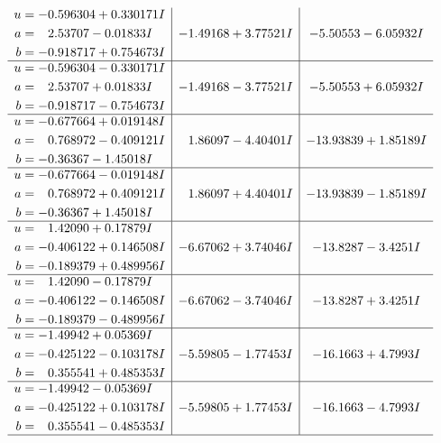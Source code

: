 \documentclass[1p]{elsarticle_modified}
\theoremstyle{definition}
\begin{document}
$$\begin{array}{c|c|c}
\begin{aligned}
u &= -0.596304 + 0.330171 I \\
a &= \phantom{-}2.53707 - 0.01833 I \\
b &= -0.918717 + 0.754673 I\end{aligned}
 & -1.49168 + 3.77521 I & -5.50553 - 6.05932 I \\ \hline\begin{aligned}
u &= -0.596304 - 0.330171 I \\
a &= \phantom{-}2.53707 + 0.01833 I \\
b &= -0.918717 - 0.754673 I\end{aligned}
 & -1.49168 - 3.77521 I & -5.50553 + 6.05932 I \\ \hline\begin{aligned}
u &= -0.677664 + 0.019148 I \\
a &= \phantom{-}0.768972 - 0.409121 I \\
b &= -0.36367 - 1.45018 I\end{aligned}
 & \phantom{-}1.86097 - 4.40401 I & -13.93839 + 1.85189 I \\ \hline\begin{aligned}
u &= -0.677664 - 0.019148 I \\
a &= \phantom{-}0.768972 + 0.409121 I \\
b &= -0.36367 + 1.45018 I\end{aligned}
 & \phantom{-}1.86097 + 4.40401 I & -13.93839 - 1.85189 I \\ \hline\begin{aligned}
u &= \phantom{-}1.42090 + 0.17879 I \\
a &= -0.406122 + 0.146508 I \\
b &= -0.189379 + 0.489956 I\end{aligned}
 & -6.67062 + 3.74046 I & -13.8287 - 3.4251 I \\ \hline\begin{aligned}
u &= \phantom{-}1.42090 - 0.17879 I \\
a &= -0.406122 - 0.146508 I \\
b &= -0.189379 - 0.489956 I\end{aligned}
 & -6.67062 - 3.74046 I & -13.8287 + 3.4251 I \\ \hline\begin{aligned}
u &= -1.49942 + 0.05369 I \\
a &= -0.425122 - 0.103178 I \\
b &= \phantom{-}0.355541 + 0.485353 I\end{aligned}
 & -5.59805 - 1.77453 I & -16.1663 + 4.7993 I \\ \hline\begin{aligned}
u &= -1.49942 - 0.05369 I \\
a &= -0.425122 + 0.103178 I \\
b &= \phantom{-}0.355541 - 0.485353 I\end{aligned}
 & -5.59805 + 1.77453 I & -16.1663 - 4.7993 I\\
 \hline 
 \end{array}$$\newpage
\end{document}
